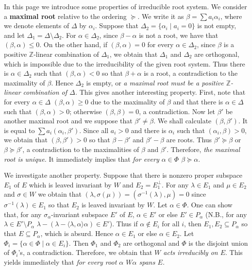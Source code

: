 \documentclass{article}
\newcommand{\InZ}{\mathbb{Z}}
\newcommand{\SBar}{\;|\;}
\begin{document}
In this page we introduce some properties of irreducible root system.
We consider a \textbf{maximal root} relative to the ordering $\succeq$.
We write it as $\beta = \sum a_i \alpha_i$, where we denote elements of $\Delta$ by $\alpha_i$.
Suppose that $\Delta_2 = \{\alpha_i \SBar a_i = 0\}$ is not empty, and let $\Delta_1 = \Delta \setminus \Delta_2$.
For $\alpha \in \Delta_2$, since $\beta - \alpha$ is not a root, we have that $(\beta, \alpha) \le 0$.
On the other hand, if $(\beta, \alpha) = 0$ for every $\alpha \in \Delta_2$, since $\beta$ is a positive $\InZ$-linear combination of $\Delta_1$, we obtain that $\Delta_1$ and $\Delta_2$ are orthogonal, which is impossible due to the irreducibility of the given root system.
Thus there is $\alpha \in \Delta_2$ such that $(\beta, \alpha) < 0$ so that $\beta + \alpha$ is a root, a contradiction to the maximality of $\beta$.
Hence $\Delta_2$ is empty, or \textit{a maximal root must be a positive $\InZ$-linear combination of $\Delta$.}
This gives another interesting property.
First, note that for every $\alpha \in \Delta$ $(\beta, \alpha) \ge 0$ due to the maximality of $\beta$ and that there is $\alpha \in \Delta$ such that $(\beta, \alpha) > 0$; otherwise $(\beta, \beta) = 0$, a contradiction.
Now let $\beta'$ be another maximal root and we suppose that $\beta' \ne \beta$.
We shall calculate $(\beta, \beta')$.
It is equal to $\sum a_i (\alpha_i, \beta')$.
Since all $a_i > 0$ and there is $\alpha_i$ such that $(\alpha_i, \beta) > 0$, we obtain that $(\beta, \beta') > 0$ so that $\beta - \beta'$ and $\beta' - \beta$ are roots.
Thus $\beta' \succeq \beta$ or $\beta \succeq \beta'$, a contradiction to the maximalities of $\beta$ and $\beta'$.
Therefore, \textit{the maximal root is unique.}
It immediately implies that \textit{for every $\alpha \in \Phi$ $\beta \succeq \alpha$}.

We investigate another property.
Suppose that there is nonzero proper subspace $E_1$ of $E$ which is leaved invariant by $W$ and $E_2 = E_1^\perp$.
For any $\lambda \in E_1$ and $\mu \in E_2$ and $\sigma \in W$ we obtain that $(\lambda, \sigma(\mu)) = (\sigma^{-1}(\lambda), \mu) = 0$ since $\sigma^{-1}(\lambda) \in E_1$ so that $E_2$ is leaved invariant by $W$.
Let $\alpha \in \Phi$.
One can show that, for any $\sigma_\alpha$-invariant subspace $E'$ of $E$, $\alpha \in E'$ or else $E' \in P_\alpha$ (N.B., for any $\lambda \in E' \setminus P_\alpha$ $\lambda - \left( \lambda - \langle \lambda, \alpha \rangle \alpha \right) \in E'$).
Thus if $\alpha \notin E_i$ for all $i$, then $E_1, E_2 \subseteq P_\alpha$ so that $E \subseteq P_\alpha$, which is absurd.
Hence $\alpha \in E_1$ or else $\alpha \in E_2$.
Let $\Phi_i = \{\alpha \in \Phi \SBar \alpha \in E_i\}$.
Then $\Phi_1$ and $\Phi_2$ are orthogonal and $\Phi$ is the disjoint union of $\Phi_i$'s, a contradiction.
Therefore, we obtain that \textit{$W$ acts irreducibly on $E$}.
This yields immediately that \textit{for every root $\alpha$ $W\alpha$ spans $E$.}
\end{document}

